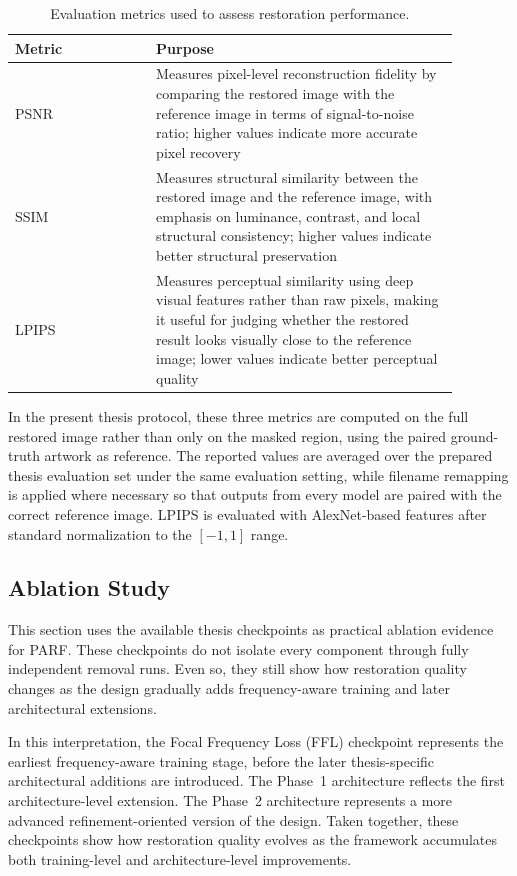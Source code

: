 \documentclass[12pt, twoside]{report}
\begin{document}
\begin{table}[H]
\centering
\caption{Evaluation metrics used to assess restoration performance.}
\label{tab:metrics}
\begin{tabular}{p{0.28\linewidth} p{0.6\linewidth}}
\toprule
\textbf{Metric} & \textbf{Purpose} \\
\midrule
PSNR & Measures pixel-level reconstruction fidelity by comparing the restored image with the reference image in terms of signal-to-noise ratio; higher values indicate more accurate pixel recovery \\
SSIM & Measures structural similarity between the restored image and the reference image, with emphasis on luminance, contrast, and local structural consistency; higher values indicate better structural preservation \\
LPIPS & Measures perceptual similarity using deep visual features rather than raw pixels, making it useful for judging whether the restored result looks visually close to the reference image; lower values indicate better perceptual quality \\
\bottomrule
\end{tabular}
\end{table}

In the present thesis protocol, these three metrics are computed on the full restored image rather than only on the masked region, using the paired ground-truth artwork as reference. The reported values are averaged over the prepared thesis evaluation set under the same evaluation setting, while filename remapping is applied where necessary so that outputs from every model are paired with the correct reference image. LPIPS is evaluated with AlexNet-based features after standard normalization to the $[-1,1]$ range.

\subsection{Ablation Study}

This section uses the available thesis checkpoints as practical ablation evidence for PARF. These checkpoints do not isolate every component through fully independent removal runs. Even so, they still show how restoration quality changes as the design gradually adds frequency-aware training and later architectural extensions.

In this interpretation, the Focal Frequency Loss (FFL) checkpoint represents the earliest frequency-aware training stage, before the later thesis-specific architectural additions are introduced. The Phase~1 architecture reflects the first architecture-level extension. The Phase~2 architecture represents a more advanced refinement-oriented version of the design. Taken together, these checkpoints show how restoration quality evolves as the framework accumulates both training-level and architecture-level improvements.
\end{document}
